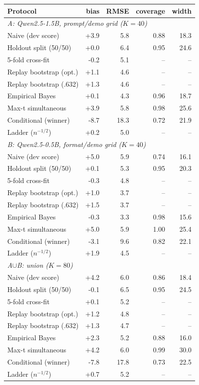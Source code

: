 \begin{tabular}{lrrrr}\toprule
Protocol & bias & RMSE & coverage & width \\\midrule
\multicolumn{5}{l}{\emph{A: Qwen2.5-1.5B, prompt/demo grid ($K{=}40$)}} \\
Naive (dev score) & +3.9 & 5.8 & 0.88 & 18.3 \\
Holdout split (50/50) & +0.0 & 6.4 & 0.95 & 24.6 \\
5-fold cross-fit & -0.2 & 5.1 & -- & -- \\
Replay bootstrap (opt.) & +1.1 & 4.6 & -- & -- \\
Replay bootstrap (.632) & +1.3 & 4.6 & -- & -- \\
Empirical Bayes & +0.1 & 4.3 & 0.96 & 18.7 \\
Max-t simultaneous & +3.9 & 5.8 & 0.98 & 25.6 \\
Conditional (winner) & -8.7 & 18.3 & 0.72 & 21.9 \\
Ladder ($n^{-1/2}$) & +0.2 & 5.0 & -- & -- \\
\multicolumn{5}{l}{\emph{B: Qwen2.5-0.5B, format/demo grid ($K{=}40$)}} \\
Naive (dev score) & +5.0 & 5.9 & 0.74 & 16.1 \\
Holdout split (50/50) & +0.1 & 5.3 & 0.95 & 20.3 \\
5-fold cross-fit & -0.3 & 4.8 & -- & -- \\
Replay bootstrap (opt.) & +1.0 & 3.7 & -- & -- \\
Replay bootstrap (.632) & +1.5 & 3.7 & -- & -- \\
Empirical Bayes & -0.3 & 3.3 & 0.98 & 15.6 \\
Max-t simultaneous & +5.0 & 5.9 & 1.00 & 25.4 \\
Conditional (winner) & -3.1 & 9.6 & 0.82 & 22.1 \\
Ladder ($n^{-1/2}$) & +1.9 & 4.5 & -- & -- \\
\multicolumn{5}{l}{\emph{A$\cup$B: union ($K{=}80$)}} \\
Naive (dev score) & +4.2 & 6.0 & 0.86 & 18.4 \\
Holdout split (50/50) & -0.1 & 6.5 & 0.95 & 24.5 \\
5-fold cross-fit & +0.1 & 5.2 & -- & -- \\
Replay bootstrap (opt.) & +1.2 & 4.8 & -- & -- \\
Replay bootstrap (.632) & +1.3 & 4.7 & -- & -- \\
Empirical Bayes & +2.3 & 5.2 & 0.88 & 16.0 \\
Max-t simultaneous & +4.2 & 6.0 & 0.99 & 30.0 \\
Conditional (winner) & -7.8 & 17.8 & 0.73 & 22.5 \\
Ladder ($n^{-1/2}$) & +0.7 & 5.2 & -- & -- \\
\bottomrule
\end{tabular}
